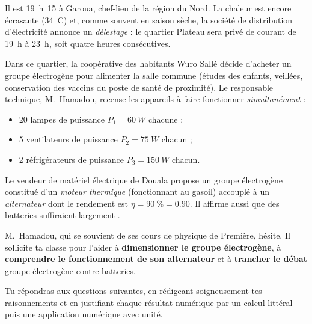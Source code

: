 \documentclass[11pt]{article}
\newcommand{\cle}[1]{{\popxbold\color{popdark}#1}}
\newcounter{popsec}
\newcounter{popsub}
\newcommand{\courssub}[1]{%
  \stepcounter{popsub}%
  \par\vspace{9pt}\noindent{\popxbold\fontsize{11.5}{13}\selectfont\color{popink}{\color{poporange}\thepopsec.\thepopsub}\hspace{6pt}#1}\par\nopagebreak\vspace{4pt}
}
\begin{document}
\begin{experience}
Il est 19~h~15 à Garoua, chef-lieu de la région du Nord. La chaleur est encore écrasante (34~\textdegree C) et, comme souvent en saison sèche, la société de distribution d'électricité annonce un \emph{délestage} : le quartier Plateau sera privé de courant de 19~h à 23~h, soit quatre heures consécutives.

Dans ce quartier, la coopérative des habitants \og Wuro Sallé \fg{} décide d'acheter un \cle{groupe électrogène} pour alimenter la salle commune (études des enfants, veillées, conservation des vaccins du poste de santé de proximité). Le responsable technique, M.~Hamadou, recense les appareils à faire fonctionner \emph{simultanément} :
\begin{itemize}
\item 20 lampes de puissance $P_1 = \SI{60}{W}$ chacune ;
\item 5 ventilateurs de puissance $P_2 = \SI{75}{W}$ chacun ;
\item 2 réfrigérateurs de puissance $P_3 = \SI{150}{W}$ chacun.
\end{itemize}

Le vendeur de matériel électrique de Douala propose un groupe électrogène constitué d'un \emph{moteur thermique} (fonctionnant au gasoil) accouplé à un \emph{alternateur} dont le rendement est $\eta = \SI{90}{\%} = \num{0,90}$. Il affirme aussi que \og des batteries suffiraient largement \fg{}.

M.~Hamadou, qui se souvient de ses cours de physique de Première, hésite. Il sollicite ta classe pour l'aider à \textbf{dimensionner le groupe électrogène}, à \textbf{comprendre le fonctionnement de son alternateur} et à \textbf{trancher le débat} groupe électrogène contre batteries.
\end{experience}

\courssub{Consignes}

Tu répondras aux questions suivantes, en rédigeant soigneusement tes raisonnements et en justifiant chaque résultat numérique par un calcul littéral puis une application numérique avec unité.
\end{document}
